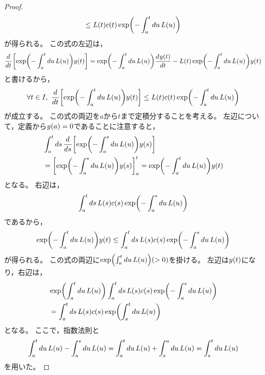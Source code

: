 \documentclass[b5paper,draft,oneside,openany]{ltjsbook} %
\begin{document}
\begin{thm}
\begin{proof}
\begin{equation}
            \leq \fun{L}{t}\fun{c}{t}\fun{\exp}{-\int_a^t du\, \fun{L}{u}}
        \end{equation}
        が得られる。
        この式の左辺は，
        \begin{equation}
            \diff{}{t}\squ{\fun{\exp}{-\int_a^t du\, \fun{L}{u}} \fun{y}{t}}
            =\fun{\exp}{-\int_a^t du\, \fun{L}{u}}\diff{\fun{y}{t}}{t}
            -\fun{L}{t}\fun{\exp}{-\int_a^t du\, \fun{L}{u}}\fun{y}{t}
        \end{equation}
        と書けるから，
        \begin{equation}
            \forall t\in I,\ \diff{}{t}\squ{\fun{\exp}{-\int_a^t du\, \fun{L}{u}} \fun{y}{t}}
            \leq \fun{L}{t}\fun{c}{t}\fun{\exp}{-\int_a^t du\, \fun{L}{u}}
        \end{equation}
        が成立する。
        この式の両辺を$a$から$t$まで定積分することを考える。
        左辺について，定義から$\fun{y}{a}=0$であることに注意すると，
        \begin{align}
            &\int_a^t ds\, \diff{}{s}\squ{\fun{\exp}{-\int_a^s du\, \fun{L}{u}} \fun{y}{s}}
            \\
            &=\squ{\fun{\exp}{-\int_a^s du\, \fun{L}{u}} \fun{y}{s}}_a^t
            =\fun{\exp}{-\int_a^t du\, \fun{L}{u}} \fun{y}{t}
        \end{align}
        となる。
        右辺は，
        \begin{equation}
            \int_a^t ds\, \fun{L}{s}\fun{c}{s}\fun{\exp}{-\int_a^s du\, \fun{L}{u}}
        \end{equation}
        であるから，
        \begin{equation}
            \fun{\exp}{-\int_a^t du\, \fun{L}{u}} \fun{y}{t}\leq 
            \int_a^t ds\, \fun{L}{s}\fun{c}{s}\fun{\exp}{-\int_a^s du\, \fun{L}{u}}
        \end{equation}
        が得られる。
        この式の両辺に$\fun{\exp}{\int_a^t du\, \fun{L}{u}}(>0)$を掛ける。
        左辺は$\fun{y}{t}$になり，右辺は，
        \begin{align}
            &\fun{\exp}{\int_a^t du\, \fun{L}{u}} \int_a^t ds\, \fun{L}{s}\fun{c}{s}\fun{\exp}{-\int_a^s du\, \fun{L}{u}}
            \\
            &=\int_a^t ds\, \fun{L}{s}\fun{c}{s}\fun{\exp}{\int_s^t du\, \fun{L}{u}}
        \end{align}
        となる。
        ここで，指数法則と
        \begin{equation}
            \int_a^t du\, \fun{L}{u}-\int_a^s du\, \fun{L}{u}
            =\int_a^t du\, \fun{L}{u}+\int_s^a du\, \fun{L}{u}
            =\int_s^t du\, \fun{L}{u}
        \end{equation}
        を用いた。


\end{proof}
\end{thm}
\end{document}
